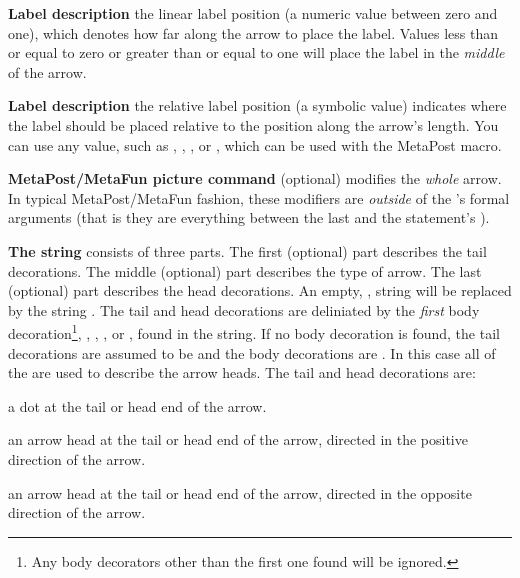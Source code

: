 \item {\bf Label description} the linear label position (a numeric value 
between zero and one), which denotes how far along the arrow to place the 
label. Values less than or equal to zero or greater than or equal to one 
will place the label in the \emph{middle} of the arrow. 

\item {\bf Label description} the relative label position (a symbolic 
value) indicates where the label should be placed relative to the position 
along the arrow's length. You can use any value, such as , 
, , or , which can be used with the MetaPost 
 macro. 

\item {\bf MetaPost/MetaFun picture command} (optional) modifies the 
\emph{whole} arrow. In typical MetaPost/MetaFun fashion, these modifiers 
are \emph{outside} of the 's formal arguments (that is they 
are everything between the last  and the statement's ). 

\stopitemize


{\bf The  string} consists of three parts. The 
first (optional) part describes the tail decorations. The middle 
(optional) part describes the type of arrow. The last (optional) part 
describes the head decorations. An empty, , 
 string will be replaced by the string . 
The tail and head decorations are deliniated by the \emph{first} body 
decoration\footnote{Any body decorators other than the first one found 
will be ignored.}, , , , or , 
found in the string. If no body decoration is found, the tail decorations 
are assumed to be  and the body decorations are . In 
this case all of the  are used to describe the 
arrow heads. The tail and head decorations are: 

\startitemize

\item {} a dot at the tail or head end of the arrow.

\item {} an arrow head at the tail or head end of the arrow, 
directed in the positive direction of the arrow. 

\item {} an arrow head at the tail or head end of the arrow, 
directed in the opposite direction of the arrow.

